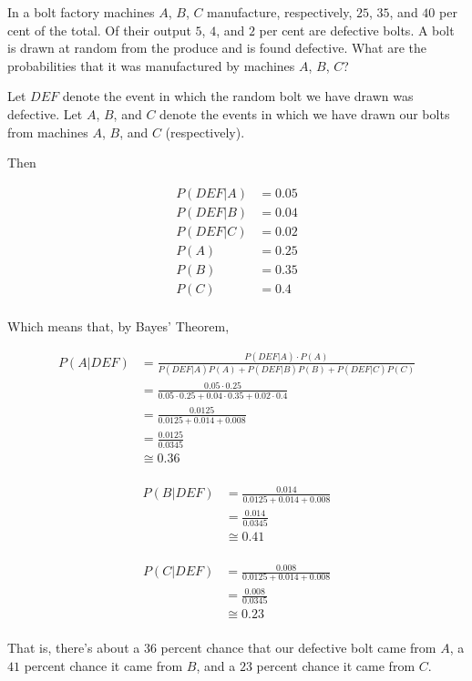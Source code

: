 \begin{problem}[Handout 4, \# 8]
  In a bolt factory machines \(A\), \(B\), \(C\) manufacture, respectively,
  \(25\), \(35\), and \(40\) per cent of the total. Of their output \(5\),
  \(4\), and \(2\) per cent are defective bolts. A bolt is drawn at random
  from the produce and is found defective. What are the probabilities that
  it was manufactured by machines \(A\), \(B\), \(C\)?
\end{problem}
\begin{solution}

Let $DEF$ denote the event in which the random bolt we have drawn was defective. Let $A$, $B$, and $C$ denote the events in which we have drawn our bolts from machines $A$, $B$, and $C$ (respectively).

Then

\begin{align*}
P(DEF | A) &= 0.05 \\
P(DEF | B) &= 0.04 \\
P(DEF | C) &= 0.02 \\
P(A) &= 0.25 \\
P(B) &= 0.35 \\
P(C) &= 0.4 \\
\end{align*}

Which means that, by Bayes' Theorem,

\begin{align*}
P(A | DEF) &= \frac{P(DEF | A) \cdot P(A)}{P(DEF | A)P(A) + P(DEF |B) P(B) + P(DEF|C)P(C)} \\
&= \frac{0.05 \cdot 0.25}{0.05 \cdot 0.25 + 0.04 \cdot 0.35 + 0.02 \cdot 0.4 } \\
&= \frac{0.0125}{0.0125 + 0.014 + 0.008} \\
&= \frac{0.0125}{0.0345} \\
&\cong 0.36 \\
\end{align*}

\begin{align*}
P(B | DEF) &= \frac{0.014}{0.0125 + 0.014 + 0.008} \\
&= \frac{0.014}{0.0345} \\
&\cong 0.41 \\
\end{align*}

\begin{align*}
P(C | DEF) &= \frac{0.008}{0.0125 + 0.014 + 0.008} \\
&= \frac{0.008}{0.0345} \\
&\cong 0.23 \\
\end{align*}

That is, there's about a $36$ percent chance that our defective bolt came from $A$, a $41$ percent chance it came from $B$, and a $23$ percent chance it came from $C$.

\end{solution}
\newpage

